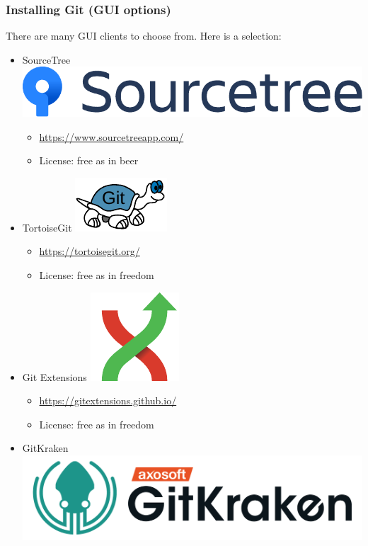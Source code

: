 \documentclass{git_course}
\begin{document}
\begin{frame}
\frametitle{Installing Git (GUI options)}
There are many GUI clients to choose from.  Here is a selection:
\begin{itemize}
    \item SourceTree
        \includegraphics[height=0.05\textheight]{images/Sourcetree-blue.pdf}
        \begin{itemize}
            \item \url{https://www.sourcetreeapp.com/}
            \item License: free as in beer
        \end{itemize}
    \item TortoiseGit
        \includegraphics[height=0.05\textheight]{images/tgit_logo.pdf}
        \begin{itemize}
            \item \url{https://tortoisegit.org/}
            \item License: free as in freedom
        \end{itemize}
    \item Git Extensions
        \includegraphics[height=0.05\textheight]{images/git-extensions-logo.pdf}
        \begin{itemize}
            \item \url{https://gitextensions.github.io/}
            \item License: free as in freedom
        \end{itemize}
    \item GitKraken
        \includegraphics[height=0.05\textheight]{images/gitkraken-logo-dark-hz.png}

\end{itemize}
\end{frame}
\end{document}
